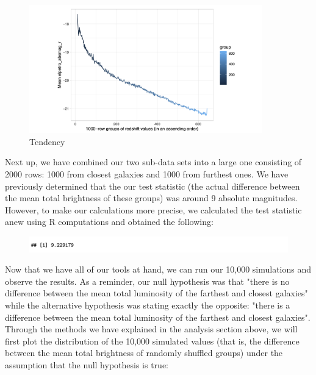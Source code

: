 \documentclass[12pt]{article}
\begin{document}
\begin{figure}[h]
	\centering
	\includegraphics[width=0.9\textwidth]{pic/r2g2.png}
	\caption{Tendency}
\end{figure}
\noindent
Next up, we have combined our two sub-data sets into a large one consisting of 2000 rows: 1000 from closest galaxies and 1000 from furthest ones. We have previously determined that the our test statistic (the actual difference between the mean total brightness of these groups) was around 9 absolute magnitudes. However, to make our calculations more precise, we calculated the test statistic anew using R computations and obtained the following:

\begin{figure}[h]
	\centering
	\includegraphics[width=1.0\textwidth]{pic/r2t4.png}
\end{figure}
\noindent
Now that we have all of our tools at hand, we can run our 10,000 simulations and observe the results. As a reminder, our null hypothesis was that "there is no difference between the mean total luminosity of the farthest and closest galaxies" while the alternative hypothesis was stating exactly the opposite: "there is a difference between the mean total luminosity of the farthest and closest galaxies". Through the methods we have explained in the analysis section above, we will first plot the distribution of the 10,000 simulated values (that is, the difference between the mean total brightness of randomly shuffled groups) under the assumption that the null hypothesis is true:
\end{document}
